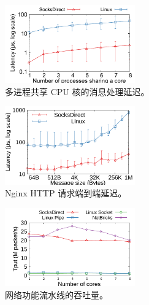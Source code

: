 \begin{figure}[htbp]
		
		\centering \includegraphics[width=0.5\textwidth]{eval/microbenchmark/sharecore-lat.pdf}
		
		\caption{多进程共享 CPU 核的消息处理延迟。}
		\label{socksdirect:fig:eval-context-switch}
\end{figure}
\begin{figure}[htbp]
				\centering \includegraphics[width=0.5\textwidth]{eval/web/msgsize-clocal-lat.pdf}
		
		\caption{Nginx HTTP 请求端到端延迟。}
		\label{socksdirect:fig:eval-nginx}
\end{figure}
\begin{figure}[htbp]
		\centering
		\includegraphics[width=0.5\textwidth]{eval/microbenchmark/nfv-tun-tput.pdf}
		
		\caption{网络功能流水线的吞吐量。}
		\label{socksdirect:fig:eval-tun-tput}
		
		
\end{figure}


